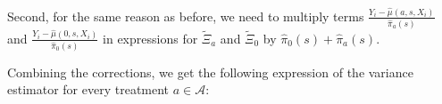 \documentclass{article}
\begin{document}

Second, for the same reason as before, we need to multiply terms $\frac{Y_i - \hat{\mu}(a,s,X_i)}{\hat{\pi}_a(s)}$ and $ \frac{Y_i - \hat{\mu}(0,s,X_i)}{\hat{\pi}_0(s)}$ in expressions for $\tilde{\Xi}_{a}$ and $\tilde{\Xi}_{0}$ by $\hat{\pi}_0(s) + \hat{\pi}_a(s)$.

Combining the corrections, we get the following expression of the variance estimator for every treatment $a \in \mathcal A$:
\end{document}
